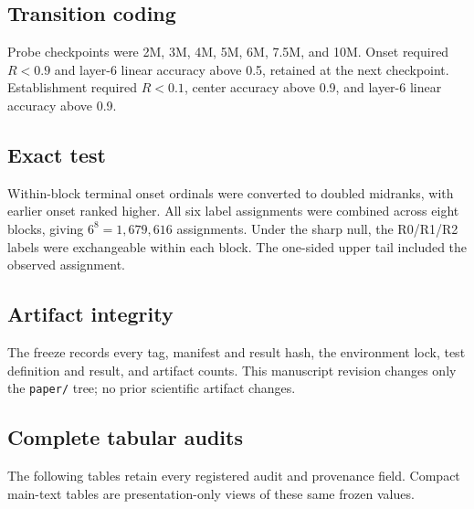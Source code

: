\documentclass[10pt]{article}
\begin{document}
\subsection{Transition coding}
Probe checkpoints were 2M, 3M, 4M, 5M, 6M, 7.5M, and 10M. Onset required
$R<0.9$ and layer-6 linear accuracy above 0.5, retained at the next checkpoint.
Establishment required $R<0.1$, center accuracy above 0.9, and layer-6 linear
accuracy above 0.9.

\subsection{Exact test}
Within-block terminal onset ordinals were converted to doubled midranks, with
earlier onset ranked higher. All six label assignments were combined across
eight blocks, giving $6^8=1,679,616$ assignments.
Under the sharp null, the R0/R1/R2 labels were exchangeable within each block.
The one-sided upper tail included the observed assignment.

\subsection{Artifact integrity}
The freeze records every tag, manifest and result hash, the environment lock,
test definition and result, and artifact counts. This manuscript revision
changes only the \texttt{paper/} tree; no prior scientific artifact changes.

\subsection{Complete tabular audits}
The following tables retain every registered audit and provenance field.
Compact main-text tables are presentation-only views of these same frozen
values.









\end{document}
